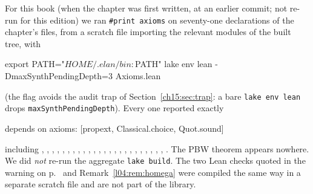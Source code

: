 For this book (when the chapter was first written, at an earlier commit; not re-run for this edition) we ran \texttt{\#print axioms} on seventy-one declarations of the chapter's files, from a
scratch file importing the relevant modules of the built tree, with
\begin{plaincode}
export PATH="$HOME/.elan/bin:$PATH"
lake env lean -DmaxSynthPendingDepth=3 Axioms.lean
\end{plaincode}
(the flag avoids the audit trap of Section~\ref{ch15:sec:trap}: a bare
\texttt{lake env lean} drops \texttt{maxSynthPendingDepth}). Every one reported exactly
\begin{plaincode}
depends on axioms: [propext, Classical.choice, Quot.sound]
\end{plaincode}
{\raggedright including , , , ,
, \allowbreak{}\allowbreak{}, \allowbreak{},
\allowbreak{}\allowbreak{}, , \allowbreak{},
\allowbreak{}\allowbreak{}\allowbreak{}\allowbreak{}, , ,
\allowbreak{}\allowbreak{}\allowbreak{}\allowbreak{}, \allowbreak{}\allowbreak{}\allowbreak{}\allowbreak{},
\allowbreak{}, , \allowbreak{},
\allowbreak{}\allowbreak{}, , \allowbreak{}\allowbreak{}\allowbreak{},
\allowbreak{}\allowbreak{}, \allowbreak{}\allowbreak{}\allowbreak{}\allowbreak{},
\allowbreak{}\allowbreak{}, \allowbreak{}\allowbreak{}\allowbreak{}\allowbreak{}. The PBW theorem  appears nowhere. We did \emph{not} re-run the aggregate \texttt{lake build}. The two Lean
checks quoted in the warning on p.~\pageref{l04:warn:inn} and Remark~\ref{l04:rem:homega} were compiled the same way in a
separate scratch file and are not part of the library.\par}

